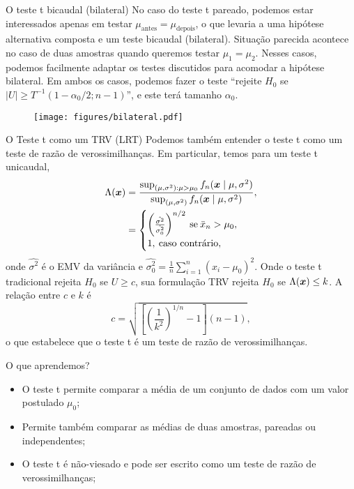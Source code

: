 \begin{frame}{O teste t bicaudal (bilateral)}
No caso do  teste t pareado, podemos estar interessados apenas em testar $\mu_{\text{antes}}= \mu_{\text{depois}}$, o que levaria a uma hipótese alternativa composta e um teste bicaudal (bilateral).
Situação parecida acontece no caso de duas amostras quando queremos testar $\mu_1 = \mu_2$.
Nesses casos, podemos facilmente adaptar os testes discutidos para acomodar a hipótese bilateral.
Em ambos os casos, podemos fazer o teste ``rejeite $H_0$ se $|U|\geq T^{-1}(1-\alpha_0/2; n-1)$'', e este terá tamanho $\alpha_0$.
\begin{figure}
 \begin{center}
  \texttt{[image: figures/bilateral.pdf]}
 \end{center}
\end{figure}
\end{frame}

\begin{frame}{O Teste t como um TRV (LRT)}
Podemos também entender o teste t como um teste de razão de verossimilhanças.
Em particular, temos para um teste t unicaudal, 
\begin{align*}
 \Lambda(\boldsymbol{x}) &= \frac{\sup_{(\mu, \sigma^2):\mu > \mu_0} f_n(\boldsymbol{x} \mid \mu, \sigma^2) }{\sup_{(\mu, \sigma^2)} f_n(\boldsymbol{x} \mid \mu, \sigma^2)}, \\
 &=  \begin{cases}
     \left(\frac{\hat{\sigma^2}}{\hat{\sigma_0^2}}\right)^{n/2} \: \text{se} \: \bar{x}_n> \mu_0,\\
     1,\:\text{caso contrário},
\end{cases} 
\end{align*}
onde $\hat{\sigma^2}$ é o EMV da variância e $\hat{\sigma_0^2} = \frac{1}{n}\sum_{i=1}^n (x_i-\mu_0)^2$.
Onde o teste t tradicional rejeita $H_0$ se $U\geq c$, sua formulação TRV rejeita $H_0$ se $\Lambda(\boldsymbol{x}) \leq k$.
A relação entre $c$ e $k$ é 
\begin{equation*}
 c = \sqrt{\left[\left(\frac{1}{k^2}\right)^{1/n} - 1 \right](n-1)}, 
\end{equation*}
o que estabelece que o teste t é um teste de razão de verossimilhanças.
\end{frame}

\begin{frame}{O que aprendemos?}
\begin{itemize}
  \item[\faLightbulbO] O teste t permite comparar a média de um conjunto de dados com um valor postulado $\mu_0$;    
  \item[\faLightbulbO] Permite também comparar as médias de duas amostras, pareadas ou independentes;
  \item O teste t é não-viesado e pode ser escrito como um teste de razão de verossimilhanças;
   \end{itemize}
 \end{frame}

